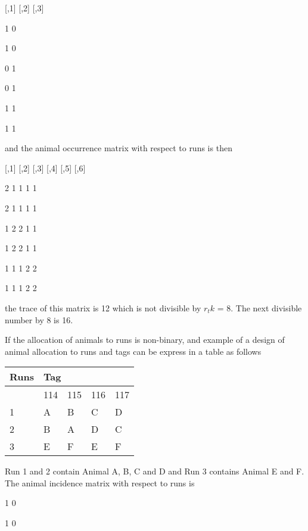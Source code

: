 [,1] [,2] [,3]

    1    0

    1    0

    0    1

    0    1

    1    1

    1    1

\noindent and the animal occurrence matrix with respect to runs is then 

   [,1] [,2] [,3] [,4] [,5] [,6]

    2    1    1    1    1

    2    1    1    1    1

    1    2    2    1    1

    1    2    2    1    1

    1    1    1    2    2

    1    1    1    2    2

\noindent the trace of this matrix is 12 which is not divisible by $r_tk$ = 8. The next divisible number by 8 is 16. 

\noindent If the allocation of animals to runs is non-binary, and example of a design of animal allocation to runs and tags can be express in a table as follows

\begin{tabular}{|p{0.3in}|p{0.3in}|p{0.3in}|p{0.3in}|p{0.3in}|} \hline 
Runs & \multicolumn{4}{|p{1.3in}|}{Tag} \\ \hline 
 & 114 & 115 & 116 & 117 \\ \hline 
1 & A & B & C & D \\ \hline 
2 & B & A & D & C \\ \hline 
3 & E & F & E & F \\ \hline 
\end{tabular}



\noindent \eject 

\noindent Run 1 and 2 contain Animal A, B, C and D and Run 3 contains Animal E and F. The animal incidence matrix with respect to runs is

\noindent     [,1] [,2] [,3]

    1    0

    1    0

